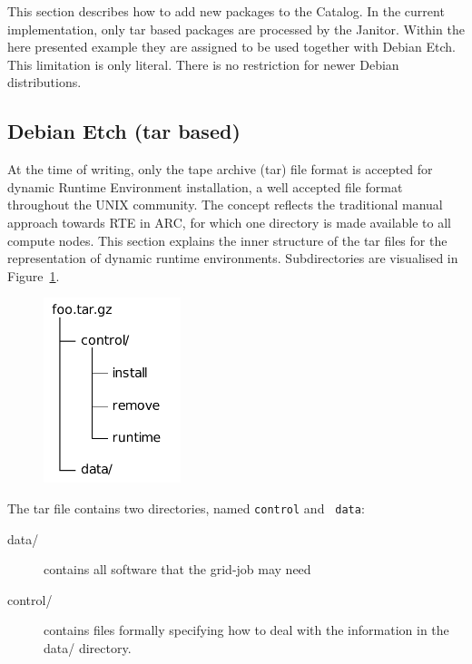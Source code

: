This section describes how to add new packages to the Catalog. In
the current implementation, only tar based packages are processed by
the Janitor.  Within the here presented example they are assigned to
be used together with Debian Etch. This limitation is only literal.
There is no restriction for newer Debian distributions.

\subsection{Debian Etch (tar based)}

At the time of writing, only the tape archive (tar) file format is
accepted for dynamic Runtime Environment installation, a well accepted
file format throughout the UNIX community.
The concept reflects the
traditional manual approach towards RTE in ARC, for which one directory
is made available to all compute nodes.
This section explains the inner structure of the tar files for the
representation of dynamic runtime environments.  Subdirectories are
visualised in Figure~\ref{fig:tar_folder}.

\begin{figure}
  \begin{center}
    \includegraphics[width=4cm]{images/tar_folder.pdf}
    \label{fig:tar_folder}
  \end{center}
\end{figure}

The tar file contains two directories, named {\tt control} and {\tt
data}:

\begin{description}
\item [data/] contains all software that the grid-job may need
\item [control/] contains files formally specifying how to deal
	with the information in the data/ directory.
\end{description}

